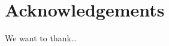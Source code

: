 \documentclass[submit]{smj}
\begin{document}
\section*{Acknowledgements}
We want to thank\ldots





%
%
%
%
%
%
\end{document}
